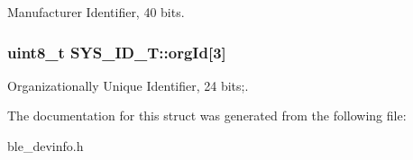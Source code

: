 Manufacturer Identifier, 40 bits. 

\hypertarget{struct_s_y_s___i_d___t_aaf2c14195d90ec1c9de9b6c57c4fcd94}{
\subsubsection[{org\-Id}]{\setlength{\rightskip}{0pt plus 5cm}uint8\-\_\-t S\-Y\-S\-\_\-\-I\-D\-\_\-\-T\-::org\-Id\mbox{[}3\mbox{]}}}\label{struct_s_y_s___i_d___t_aaf2c14195d90ec1c9de9b6c57c4fcd94}


Organizationally Unique Identifier, 24 bits;. 



The documentation for this struct was generated from the following file\-:\begin{DoxyCompactItemize}
\item 
ble\-\_\-devinfo.\-h\end{DoxyCompactItemize}
